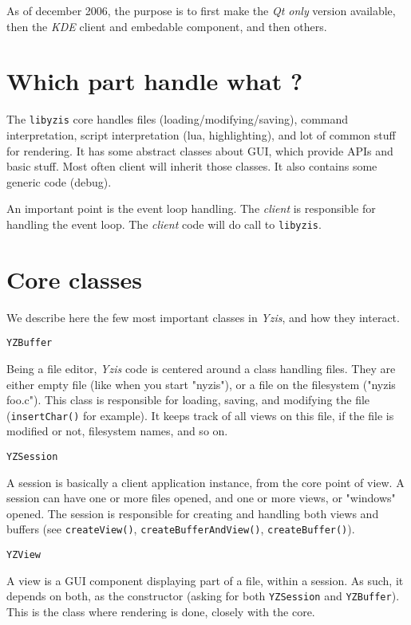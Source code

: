 \documentclass[a4paper,12pt]{report}
\begin{document}
As of december 2006, the purpose is to first make the \emph{Qt only}
version available, then the \emph{KDE} client and embedable component, and
then others.

\section{Which part handle what ?}

The \verb+libyzis+ core handles files (loading/modifying/saving), command
interpretation, script interpretation (lua, highlighting), and lot of
common stuff for rendering.
It has some abstract classes about GUI, which provide APIs and basic stuff.
Most often client will inherit those classes.
It also contains some generic code (debug).

An important point is the event loop handling. The \emph{client} is
responsible for handling the event loop. The \emph{client} code will do
call to \verb+libyzis+.

\section{Core classes}

We describe here the few most important classes in \emph{Yzis}, and how
they interact.

\verb+YZBuffer+

Being a file editor, \emph{Yzis} code is centered around a class handling
files. They are either empty file (like when you start "nyzis"), or a file on
the filesystem ("nyzis foo.c").
This class is responsible for loading, saving, and modifying the file
(\verb+insertChar()+ for example). It keeps track of all views on this file,
if the file is modified or not, filesystem names, and so on.

\verb+YZSession+

A session is basically a client application instance, from the core point
of view. A session can have one or more files opened, and one or more views,
or "windows" opened. The session is responsible for creating and handling
both views and buffers (see \verb+createView()+, \verb+createBufferAndView()+,
\verb+createBuffer()+).

\verb+YZView+

A view is a GUI component displaying part of a file, within a session. As
such, it depends on both, as the constructor (asking for both
\verb+YZSession+ and \verb+YZBuffer+). This is the class where rendering is
done, closely with the core.
\end{document}

